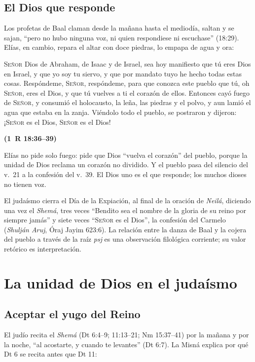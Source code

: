 \documentclass[11pt,letterpaper]{article}
\newcommand{\SENOR}{\textsc{Señor}}
\newcommand{\fuente}[1]{\par\hfill{\upshape\bfseries\small\textcolor{azul}{#1}}}
\begin{document}
\subsection{El Dios que responde}
Los profetas de Baal claman desde la mañana hasta el mediodía, saltan y se sajan, ``pero no hubo ninguna voz, ni quien respondiese ni escuchase'' (18:29). Elías, en cambio, repara el altar con doce piedras, lo empapa de agua y ora:

\begin{cita}\SENOR{} Dios de Abraham, de Isaac y de Israel, sea hoy manifiesto que tú eres Dios en Israel, y que yo soy tu siervo, y que por mandato tuyo he hecho todas estas cosas. Respóndeme, \SENOR, respóndeme, para que conozca este pueblo que tú, oh \SENOR, eres el Dios, y que tú vuelves a ti el corazón de ellos. Entonces cayó fuego de \SENOR, y consumió el holocausto, la leña, las piedras y el polvo, y aun lamió el agua que estaba en la zanja. Viéndolo todo el pueblo, se postraron y dijeron: ¡\SENOR{} es el Dios, \SENOR{} es el Dios!\fuente{(1~R 18:36--39)}\end{cita}

Elías no pide solo fuego: pide que Dios ``vuelva el corazón'' del pueblo, porque la unidad de Dios reclama un corazón no dividido. Y el pueblo pasa del silencio del v.~21 a la confesión del v.~39. El Dios uno es el que responde; los muchos dioses no tienen voz.

\begin{nota}[Precisión]
El judaísmo cierra el Día de la Expiación, al final de la oración de \emph{Neilá}, diciendo una vez el \emph{Shemá}, tres veces ``Bendito sea el nombre de la gloria de su reino por siempre jamás'' y siete veces ``\SENOR{} es el Dios'', la confesión del Carmelo (\emph{Shulján Aruj}, Óraj Jayim 623:6). La relación entre la danza de Baal y la cojera del pueblo a través de la raíz \emph{psj} es una observación filológica corriente; su valor retórico es interpretación.
\end{nota}

\section{La unidad de Dios en el judaísmo}\label{sec:judaismo-uno}

\subsection{Aceptar el yugo del Reino}
El judío recita el \emph{Shemá} (Dt 6:4--9; 11:13--21; Nm 15:37--41) por la mañana y por la noche, ``al acostarte, y cuando te levantes'' (Dt 6:7). La Misná explica por qué Dt 6 se recita antes que Dt 11:
\end{document}
